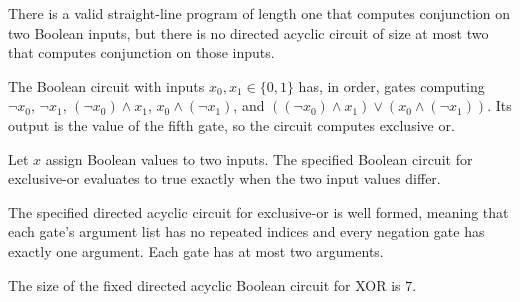 \begin{theorem}
\label{BoolCircuit.exists_straightLine_and_not_dagCircuit}
\leanok
{}
There is a valid straight-line program of length one that computes conjunction on two
Boolean inputs, but there is no directed acyclic circuit of size at most two that
computes conjunction on those inputs.
\end{theorem}

\begin{definition}
\label{BoolCircuit.xorCircuit}
\leanok
{}
The Boolean circuit with inputs $x_0,x_1\in\{0,1\}$ has, in order, gates computing $\neg
x_0$, $\neg x_1$, $(\neg x_0)\land x_1$, $x_0\land(\neg x_1)$, and $((\neg x_0)\land
x_1)\lor(x_0\land(\neg x_1))$. Its output is the value of the fifth gate, so the circuit
computes exclusive or.
\end{definition}

\begin{theorem}
\label{BoolCircuit.xorCircuit_eval}
\leanok
{}
Let $x$ assign Boolean values to two inputs. The specified Boolean circuit for
exclusive-or evaluates to true exactly when the two input values differ.
\end{theorem}

\begin{theorem}
\label{BoolCircuit.xorCircuit_isFaninTwo}
\leanok
{}
The specified directed acyclic circuit for exclusive-or is well formed, meaning that
each gate's argument list has no repeated indices and every negation gate has exactly
one argument. Each gate has at most two arguments.
\end{theorem}

\begin{theorem}
\label{BoolCircuit.xorCircuit_size}
\leanok
{}
The size of the fixed directed acyclic Boolean circuit for XOR is $7$.
\end{theorem}

